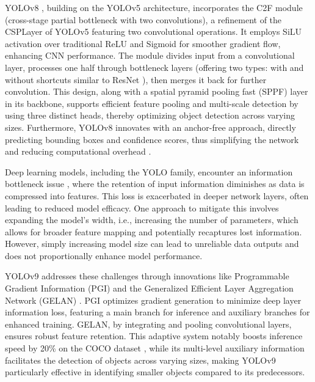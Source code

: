 YOLOv8 \cite{ultralyticsYOLOv8}, building on the YOLOv5 \cite{Jocher2020YOLOv5} architecture, incorporates the C2F module (cross-stage partial bottleneck with two convolutions), a refinement of the CSPLayer of YOLOv5 featuring two convolutional operations. It employs SiLU activation over traditional ReLU and Sigmoid \cite{elfwing2018sigmoid} for smoother gradient flow, enhancing CNN performance. The module divides input from a convolutional layer, processes one half through bottleneck layers (offering two types: with and without shortcuts similar to ResNet \cite{targ2016resnet}), then merges it back for further convolution. This design, along with a spatial pyramid pooling fast (SPPF) layer in its backbone, supports efficient feature pooling and multi-scale detection by using three distinct heads, thereby optimizing object detection across varying sizes. Furthermore, YOLOv8 innovates with an anchor-free approach, directly predicting bounding boxes and confidence scores, thus simplifying the network and reducing computational overhead \cite{law2018cornernet,duan2019centernet,tian2019fcos}.

Deep learning models, including the YOLO family, encounter an information bottleneck issue \cite{tishby2015deep,tishby2000information}, where the retention of input information diminishes as data is compressed into features. This loss is exacerbated in deeper network layers, often leading to reduced model efficacy. One approach to mitigate this involves expanding the model’s width, i.e., increasing the number of parameters, which allows for broader feature mapping and potentially recaptures lost information. However, simply increasing model size can lead to unreliable data outputs and does not proportionally enhance model performance.

YOLOv9 addresses these challenges through innovations like Programmable Gradient Information (PGI) and the Generalized Efficient Layer Aggregation Network (GELAN) \cite{wang2024yolov9}. PGI optimizes gradient generation to minimize deep layer information loss, featuring a main branch for inference and auxiliary branches for enhanced training. GELAN, by integrating and pooling convolutional layers, ensures robust feature retention. This adaptive system notably boosts inference speed by 20\% \cite{wang2024yolov9} on the COCO dataset \cite{lin2014microsoft}, while its multi-level auxiliary information facilitates the detection of objects across varying sizes, making YOLOv9 particularly effective in identifying smaller objects compared to its predecessors.

